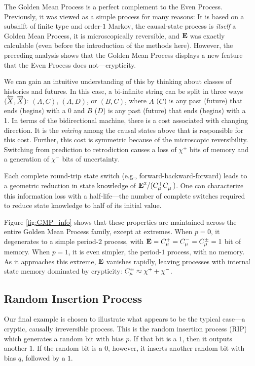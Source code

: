 The Golden Mean Process is a perfect complement to the Even Process.
Previously, it was viewed as a simple process for many reasons: It is based on
a subshift of finite type and order-$1$ Markov, the causal-state process is
\emph{itself} a Golden Mean Process, it is microscopically reversible, and
${\bf E}$ was exactly calculable (even before the introduction of the methods here).
However, the preceding analysis shows that the Golden Mean Process displays a
new feature that the Even Process does not---crypticity.

We can gain an intuitive understanding of this by thinking about classes
of histories and futures. In this case, a bi-infinite string can be split in
three ways $(\overleftarrow {{X}}, \overrightarrow{{X}})$: $(A,C)$, $(A,D)$, or $(B,C)$,
where $A$ ($C$) is any past (future) that ends (begins) with a 0 and $B$
($D$) is any past (future) that ends (begins) with a 1. In terms of the
bidirectional machine, there is a cost associated with changing direction. 
It is the \emph{mixing} among the causal states above that is responsible
for this cost. Further, this cost is symmetric because of the microscopic reversibility. Switching
from prediction to retrodiction causes a loss of $\chi^+$ bits of memory and
a generation of $\chi^-$ bits of uncertainty.

Each complete round-trip state switch (e.g., forward-backward-forward)
leads to a geometric reduction in
state knowledge of ${\bf E}^2/(C_\mu^{+} C_\mu^{-})$. One can characterize
this information loss with a half-life---the number of complete switches
required to reduce state knowledge to half of its initial value. 

Figure \ref{fig:GMP_info} shows that these properties are maintained across
the entire Golden Mean Process family, except at extremes. When $p = 0$, it
degenerates to a simple period-$2$ process, with
${\bf E} = C_\mu^{+} = C_\mu^{-} = C_\mu^{\pm} = 1$ bit of memory. When $p = 1$, it
is even simpler, the period-$1$ process, with no memory. As it approaches this
extreme, ${\bf E}$ vanishes rapidly, leaving processes with internal state memory
dominated by crypticity: $C_\mu^{\pm} \approx \chi^+ + \chi^-$.

\subsection{Random Insertion Process}

Our final example is chosen to illustrate what appears to be the typical
case---a cryptic, causally irreversible process. This is the random insertion
process (RIP) which generates a random bit with bias $p$. If that bit is a
$1$, then it outputs another $1$. If the random bit is a $0$, however, it
inserts another random bit with bias $q$, followed by a $1$.


